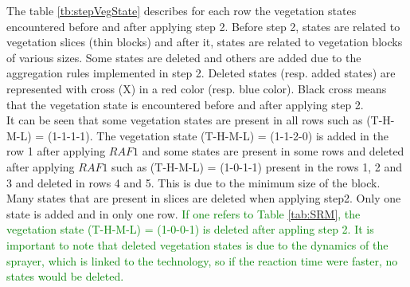 \documentclass[preprint,3p,times,twocolumn]{elsarticle}
\newcommand{\Rim}[1]{\textcolor{Green}{#1}}
\begin{document}
The table \ref{tb:stepVegState} describes for each row the vegetation states encountered before and after applying step 2. Before step 2, states are related to vegetation slices (thin blocks) and after it, states are related to vegetation blocks of various sizes.
Some states are deleted and others are added due to the aggregation rules implemented in step 2.
Deleted states (resp. added states) are represented with cross (X) in a red color (resp. blue color). Black cross means that the vegetation state is encountered before and after applying step 2. \\
It can be seen that some vegetation states are present in all rows such as (T-H-M-L) = (1-1-1-1). The vegetation state (T-H-M-L) = (1-1-2-0) is added in the row 1 after applying $RAF1$ and some states are present in some rows and deleted after applying $RAF1$ such as (T-H-M-L) = (1-0-1-1) present in the rows 1, 2 and 3 and deleted in rows 4 and 5. This is due to the minimum size of the block. Many states that are present in slices are deleted when applying step2. Only one state is added and in only one row. \Rim{If one refers to Table \ref{tab:SRM}, the vegetation state (T-H-M-L) = (1-0-0-1) is deleted after appling step 2. It is important to note that deleted vegetation states is due to the dynamics of the sprayer, which is linked to the technology, so if the reaction time were faster, no states would be deleted.}
\end{document}
